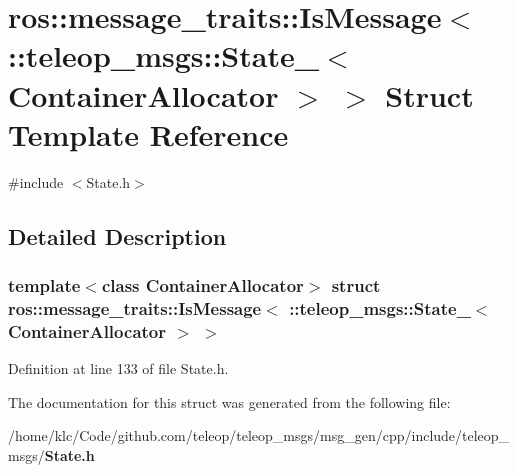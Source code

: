 \section{ros::message\_\-traits::IsMessage$<$ ::teleop\_\-msgs::State\_\-$<$ ContainerAllocator $>$ $>$ Struct Template Reference}
\label{structros_1_1message__traits_1_1IsMessage_3_01_1_1teleop__msgs_1_1State___3_01ContainerAllocator_01_4_01_4}


{\ttfamily \#include $<$State.h$>$}



\subsection{Detailed Description}
\subsubsection*{template$<$class ContainerAllocator$>$ struct ros::message\_\-traits::IsMessage$<$ ::teleop\_\-msgs::State\_\-$<$ ContainerAllocator $>$ $>$}



Definition at line 133 of file State.h.



The documentation for this struct was generated from the following file:\begin{DoxyCompactItemize}
\item 
/home/klc/Code/github.com/teleop/teleop\_\-msgs/msg\_\-gen/cpp/include/teleop\_\-msgs/{\bf State.h}\end{DoxyCompactItemize}
